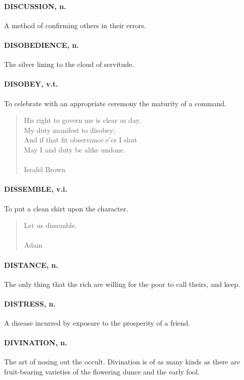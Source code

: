 \documentclass[11pt]{article}
\begin{document}
\paragraph{DISCUSSION, n.}  A method of confirming others in their errors.

\paragraph{DISOBEDIENCE, n.}  The silver lining to the cloud of servitude.

\paragraph{DISOBEY, v.t.}  To celebrate with an appropriate ceremony the maturity
of a command.

\begin{quote}   His right to govern me is clear as day, \\
  My duty manifest to disobey; \\
  And if that fit observance e'er I shut \\
  May I and duty be alike undone. \\
 \\
Israfel Brown \end{quote}


\paragraph{DISSEMBLE, v.i.}  To put a clean shirt upon the character.
\begin{quote}   Let us dissemble. \\
 \\
Adam \end{quote}


\paragraph{DISTANCE, n.}  The only thing that the rich are willing for the poor to
call theirs, and keep.

\paragraph{DISTRESS, n.}  A disease incurred by exposure to the prosperity of a
friend.

\paragraph{DIVINATION, n.}  The art of nosing out the occult.  Divination is of as
many kinds as there are fruit-bearing varieties of the flowering dunce
and the early fool.
\end{document}

